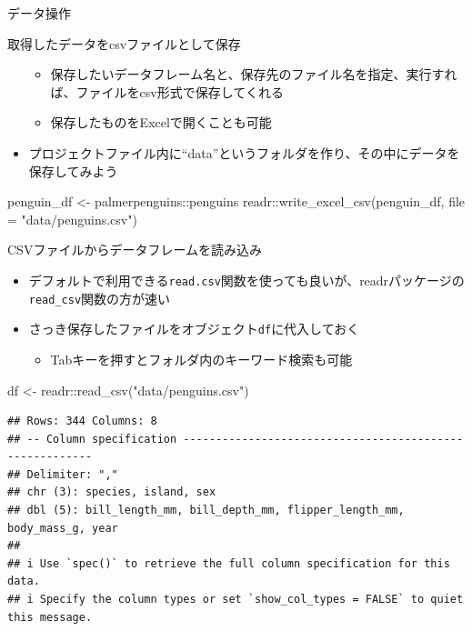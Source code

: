 \documentclass[
  ignorenonframetext,
]{beamer}
\newenvironment{Shaded}{\begin{snugshade}}{\end{snugshade}}
\newcommand{\AttributeTok}[1]{\textcolor[rgb]{0.77,0.63,0.00}{#1}}
\newcommand{\FunctionTok}[1]{\textcolor[rgb]{0.00,0.00,0.00}{#1}}
\newcommand{\NormalTok}[1]{#1}
\newcommand{\OtherTok}[1]{\textcolor[rgb]{0.56,0.35,0.01}{#1}}
\newcommand{\SpecialCharTok}[1]{\textcolor[rgb]{0.00,0.00,0.00}{#1}}
\newcommand{\StringTok}[1]{\textcolor[rgb]{0.31,0.60,0.02}{#1}}
\providecommand{\tightlist}{%
  \setlength{\itemsep}{0pt}\setlength{\parskip}{0pt}}
\begin{document}
\begin{frame}[fragile]{データ操作}
\begin{block}{取得したデータをcsvファイルとして保存}
\begin{itemize}
  \begin{itemize}
  \tightlist
  \item
    保存したいデータフレーム名と、保存先のファイル名を指定、実行すれば、ファイルをcsv形式で保存してくれる
  \item
    保存したものをExcelで開くことも可能
  \end{itemize}
\item
  プロジェクトファイル内に``data''というフォルダを作り、その中にデータを保存してみよう
\end{itemize}

\begin{Shaded}
\begin{Highlighting}[]
\NormalTok{penguin\_df }\OtherTok{\textless{}{-}}\NormalTok{ palmerpenguins}\SpecialCharTok{::}\NormalTok{penguins}
\NormalTok{readr}\SpecialCharTok{::}\FunctionTok{write\_excel\_csv}\NormalTok{(penguin\_df, }\AttributeTok{file =} \StringTok{"data/penguins.csv"}\NormalTok{)}
\end{Highlighting}
\end{Shaded}
\end{block}

\begin{block}{CSVファイルからデータフレームを読み込み}
\protect\hypertarget{csvux30d5ux30a1ux30a4ux30ebux304bux3089ux30c7ux30fcux30bfux30d5ux30ecux30fcux30e0ux3092ux8aadux307fux8fbcux307f}{}
\begin{itemize}
\tightlist
\item
  デフォルトで利用できる\texttt{read.csv}関数を使っても良いが、readrパッケージの\texttt{read\_csv}関数の方が速い
\item
  さっき保存したファイルをオブジェクト\texttt{df}に代入しておく

  \begin{itemize}
  \tightlist
  \item
    Tabキーを押すとフォルダ内のキーワード検索も可能
  \end{itemize}
\end{itemize}

\begin{Shaded}
\begin{Highlighting}[]
\NormalTok{df }\OtherTok{\textless{}{-}}\NormalTok{ readr}\SpecialCharTok{::}\FunctionTok{read\_csv}\NormalTok{(}\StringTok{"data/penguins.csv"}\NormalTok{)}
\end{Highlighting}
\end{Shaded}

\begin{verbatim}
## Rows: 344 Columns: 8
## -- Column specification --------------------------------------------------------
## Delimiter: ","
## chr (3): species, island, sex
## dbl (5): bill_length_mm, bill_depth_mm, flipper_length_mm, body_mass_g, year
## 
## i Use `spec()` to retrieve the full column specification for this data.
## i Specify the column types or set `show_col_types = FALSE` to quiet this message.
\end{verbatim}


\end{block}
\end{frame}
\end{document}
